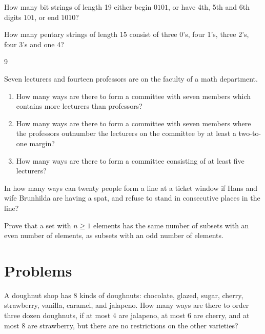 \begin{exer}
How many bit strings of length 19 either begin $0101$, or have 4th, 5th and 6th digits $101$, or end $1010$?
\end{exer}

\begin{exer}
How many pentary strings of length 15 consist of three 0's, four 1's, three 2's, four 3's and one 4?
\end{exer}

\begin{exer}%
9
\end{exer}

\begin{exer}
Seven lecturers and fourteen professors are on the faculty of a math department.
\begin{enumerate}[label=(\alph*)]
\item How many ways are there to form a committee with seven members which contains more lecturers
      than professors?
\item How many ways are there to form a committee with seven members where the professors outnumber
      the lecturers on the committee by at least a two-to-one margin?
\item How many ways are there to form a committee consisting of at least five lecturers?
\end{enumerate}
\end{exer}

\begin{exer}
In how many ways can twenty people form a line at a ticket window if Hans and wife Brunhilda are having a spat, and refuse to stand in consecutive places in the line?

\end{exer}

\begin{exer}
Prove that a set with $n\geq 1$ elements has the same number of subsets with an even number of elements, as
subsets with an odd number of elements.
\end{exer}

\section{Problems}

\begin{prob}
A doughnut shop has 8 kinds of doughnuts: chocolate, glazed, sugar, cherry, strawberry, vanilla, caramel, and jalapeno. How many ways are there to order three 
dozen doughnuts, if at most 4 are jalapeno, at most 6 are cherry, and at most 8 are strawberry, but there are no restrictions on the other varieties?
\end{prob}

